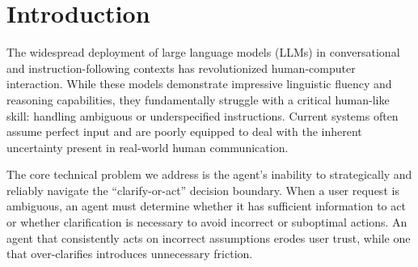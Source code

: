 \documentclass{article}
\theoremstyle{plain}
\theoremstyle{definition}
\theoremstyle{remark}
\begin{document}
\begin{abstract}
While large language models (LLMs) demonstrate impressive reasoning capabilities, they frequently struggle with ambiguous or underspecified queries, often hallucinating answers or guessing user intent. A robust conversational agent must reliably navigate the ``clarify-or-act'' decision boundary, detecting ambiguity and asking targeted clarification questions before proceeding. In this work, we introduce AskBeforeAnswer, a novel training framework that aligns LLMs to a clarification-first behavior. Rather than relying solely on standard Supervised Fine-Tuning (SFT) which is prone to hallucination, we propose a two-stage hybrid pipeline utilizing Group Relative Policy Optimization (GRPO) warm-started from an SFT foundation. Our methodology uses purely programmatic, deterministic reward functions during the GRPO stage to explicitly penalize hallucination and enforce logical action routing. Empirical evaluations demonstrate a fundamental trade-off between post-training paradigms: DPO excels at stylistic alignment and balancing clarify ratios, while GRPO excels at factual calibration and safety. Our SFT$\rightarrow$GRPO pipeline achieves flawless 100\% schema adherence while tripling factual accuracy over SFT baselines, establishing a highly conservative, hallucination-resistant agent.
\end{abstract}

\section{Introduction}

The widespread deployment of large language models (LLMs) in conversational and instruction-following contexts has revolutionized human-computer interaction. While these models demonstrate impressive linguistic fluency and reasoning capabilities, they fundamentally struggle with a critical human-like skill: handling ambiguous or underspecified instructions. Current systems often assume perfect input and are poorly equipped to deal with the inherent uncertainty present in real-world human communication. 

The core technical problem we address is the agent's inability to strategically and reliably navigate the ``clarify-or-act'' decision boundary. When a user request is ambiguous, an agent must determine whether it has sufficient information to act or whether clarification is necessary to avoid incorrect or suboptimal actions. An agent that consistently acts on incorrect assumptions erodes user trust, while one that over-clarifies introduces unnecessary friction.
\end{document}
